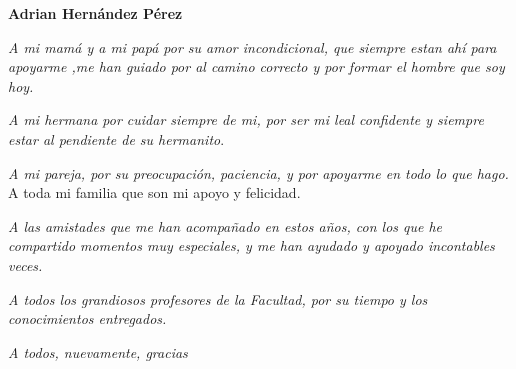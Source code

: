 \begin{acknowledgements}
	
	\begin{flushleft}
	\textbf{ {\LARGE Adrian Hernández Pérez}}
	\newline

	{\large 	\emph{A mi mamá y a mi papá por su amor incondicional, que siempre estan ahí para apoyarme ,me han guiado por al camino correcto y por formar el hombre que soy hoy.}
		\newline
		
	\emph{	A mi hermana por cuidar siempre de mi, por ser mi leal confidente y siempre estar al pendiente de su hermanito}.
		\newline
		
	\emph{	A mi pareja, por su preocupación, paciencia, y por apoyarme en todo lo que hago. }
		\newline
		A toda mi familia que son mi apoyo y felicidad.
		\newline
		
	\emph{	A las amistades que me han acompañado en estos años, con los que he compartido momentos muy especiales, y me han ayudado y apoyado incontables veces.}
		\newline
		
	\emph{	A todos los grandiosos  profesores de la Facultad, por su tiempo y los conocimientos entregados.}
		\newline
		
		\emph{A todos, nuevamente, gracias}}
	\end{flushleft}


   
   
   
  
 
  
   
   
  
   
\end{acknowledgements}
